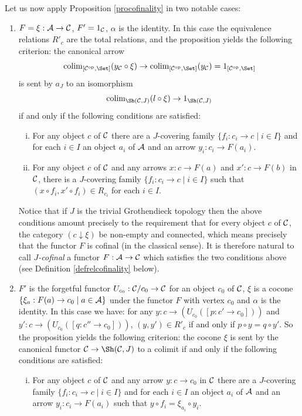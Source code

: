 \documentclass[a4paper,12pt]{article}
\begin{document}
Let us now apply Proposition \ref{procofinality} in two notable cases:
\begin{enumerate}[(1)]
	\item $F=\xi:{\cal A}\to {\cal C}$, $F'=1_{\cal C}$, $\alpha$ is the identity. In this case the equivalence relations $R'_{c}$ are the total relations, and the proposition yields the following criterion: the canonical arrow
	\[
	\textup{colim}_{[{\cal C}^{\textup{op}}, \Set]}(y_{\cal C}\circ \xi) \to \textup{colim}_{[{\cal C}^{\textup{op}}, \Set]}(y_{\cal C})=1_{[{\cal C}^{\textup{op}}, \Set]}
	\]
	is sent by $a_{J}$ to an isomorphism
	\[
	\textup{colim}_{\Sh({\cal C}, J)}(l\circ \xi) \to 1_{\Sh({\cal C}, J)}
	\]
	if and only if the following conditions are satisfied:
	\begin{enumerate}[(i)]
		\item For any object $c$ of $\cal C$ there are a $J$-covering family $\{f_i: c_i \to c \mid i\in I\}$ and for each $i\in I$ an object $a_{i}$ of $\cal A$ and an arrow $y_i:c_{i}\to F(a_{i})$.
		
		\item For any object $c$ of $\cal C$ and any arrows $x:c\to F(a)$ and $x':c\to F(b)$ in $\cal C$, there is a $J$-covering family $\{f_i: c_i \to c \mid i\in I\}$ such that $(x\circ f_i, x'\circ f_i)\in R_{c_{i}}$ for each $i\in I$. 
	\end{enumerate}	
	
	Notice that if $J$ is the trivial Grothendieck topology then the above conditions amount precisely to the requirement that for every object $c$ of $\cal C$, the category $(c\downarrow \xi)$ be non-empty and connected, which means precisely that the functor $F$ is cofinal (in the classical sense). It is therefore natural to call \emph{$J$-cofinal} a functor $F:{\cal A}\to {\cal C}$ which satisfies the two conditions above (see Definition \ref{defrelcofinality} below). 
	
	\item $F'$ is the forgetful functor $U_{c_{0}}:{\cal C}\slash c_{0}\to {\cal C}$ for an object $c_{0}$ of $\cal C$, $\xi$ is a cocone $\{\xi_{a}: F(a)\to c_{0} \mid a\in {\cal A}\}$ under the functor $F$ with vertex $c_{0}$ and $\alpha$ is the identity. In this case we have: for any $y:c \to (U_{c_{0}}([p:c'\to c_{0}]))$ and $y':c \to (U_{c_{0}}([q:c''\to c_{0}]))$, $(y, y')\in R'_{c}$ if and only if $p\circ y=q\circ y'$. So the proposition yields the following criterion: the cocone $\xi$ is sent by the canonical functor ${\cal C}\to \Sh({\cal C}, J)$ to a colimit if and only if the following conditions are satisfied:
	\begin{enumerate}[(i)]
		\item For any object $c$ of $\cal C$ and any arrow $y:c\to c_{0}$ in $\cal C$ there are a $J$-covering family $\{f_i: c_i \to c \mid i\in I\}$ and for each $i\in I$ an object $a_{i}$ of $\cal A$ and an arrow $y_i:c_{i}\to F(a_{i})$ such that $y\circ f_{i}=\xi_{a_{i}}\circ y_{i}$.
		

\end{enumerate}
\end{enumerate}
\end{document}

